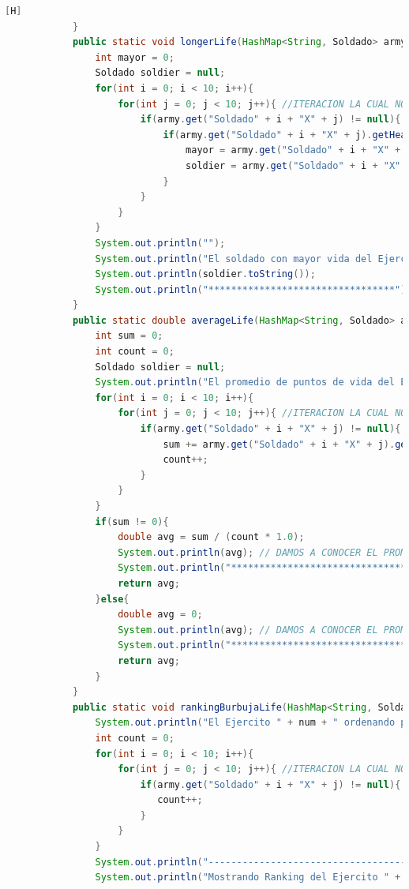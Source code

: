 \documentclass{article}
\begin{document}
\begin{lstlisting}[language=java,caption={Las lineas de codigos del metodo creado:}][H]
			}
			public static void longerLife(HashMap<String, Soldado> army , int num){
				int mayor = 0;
				Soldado soldier = null;
				for(int i = 0; i < 10; i++){
					for(int j = 0; j < 10; j++){ //ITERACION LA CUAL NOS AYUDA A PASAR POR TODOS LOS SOLDADOS DE CADA EJERCITO
						if(army.get("Soldado" + i + "X" + j) != null){ //VERIFICAMOS QUE EL SOLDADO EL CUAL ESTAMOS VERIFICANOD NO SEA UNO NULO
							if(army.get("Soldado" + i + "X" + j).getHealth() > mayor){
								mayor = army.get("Soldado" + i + "X" + j).getHealth(); //DETECTAMOS EL MAYOR EL CUAL VAMOS COMPRANDO CON LOS DEMAS SOLDADOS PARA TENER SOLO AL SOLDADO EL CUAL TENGA LA MAYOR VIDA
								soldier = army.get("Soldado" + i + "X" + j); //SOLDIER CONTENDRA A ESTE SOLDADO EL CUAL DESPUES SE IMPRIMIRA SUS DATOS PARA VER DE QUE SOLDADO SE TRATA
							}
						}
					}
				}
				System.out.println("");
				System.out.println("El soldado con mayor vida del Ejercito " + num + " es: ");
				System.out.println(soldier.toString());
				System.out.println("*********************************");
			}
			public static double averageLife(HashMap<String, Soldado> army , int num){
				int sum = 0;
				int count = 0;
				Soldado soldier = null;
				System.out.println("El promedio de puntos de vida del Ejercito " + num + " es: ");
				for(int i = 0; i < 10; i++){
					for(int j = 0; j < 10; j++){ //ITERACION LA CUAL NOS AYUDA A PASAR POR TODOS LOS SOLDADOS DE CADA EJERCITO
						if(army.get("Soldado" + i + "X" + j) != null){ 
							sum += army.get("Soldado" + i + "X" + j).getHealth();
							count++;
						}
					}
				}
				if(sum != 0){
					double avg = sum / (count * 1.0);
					System.out.println(avg); // DAMOS A CONOCER EL PROMEDIO DE VIDA DE CADA EJERCITO 
					System.out.println("*********************************");
					return avg;
				}else{
					double avg = 0;
					System.out.println(avg); // DAMOS A CONOCER EL PROMEDIO DE VIDA DE CADA EJERCITO 
					System.out.println("*********************************");
					return avg;
				}
			}
			public static void rankingBurbujaLife(HashMap<String, Soldado> army , int num){
				System.out.println("El Ejercito " + num + " ordenando por metodo burbuja: ");
				int count = 0;
				for(int i = 0; i < 10; i++){
					for(int j = 0; j < 10; j++){ //ITERACION LA CUAL NOS AYUDA A PASAR POR TODOS LOS SOLDADOS DE CADA EJERCITO
						if(army.get("Soldado" + i + "X" + j) != null){ 
						   count++;
						}
					}
				}
				System.out.println("------------------------------------------");
				System.out.println("Mostrando Ranking del Ejercito " + num + " ..... ////// --->");

\end{lstlisting}
\end{document}
